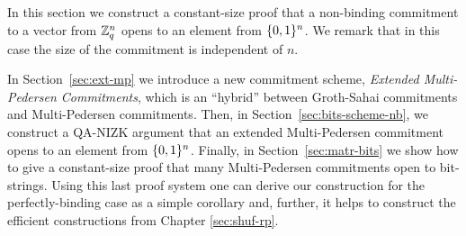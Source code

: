 In this section we construct a constant-size proof that a non-binding commitment to a vector from $\mathbb{Z}_q^n$ opens to an element from $\{0,1\}^n$. We remark that in this case the size of the commitment is independent of $n$. 

In Section~\ref{sec:ext-mp} we introduce a new commitment scheme, \emph{Extended Multi-Pedersen Commitments}, which is an ``hybrid'' between Groth-Sahai commitments and Multi-Pedersen commitments.
Then, in Section~\ref{sec:bits-scheme-nb}, we construct a QA-NIZK argument that an extended Multi-Pedersen commitment opens to an element from $\{0,1\}^n$. Finally, in Section~\ref{sec:matr-bits} we show how to give a constant-size proof that many Multi-Pedersen commitments open to bit-strings. Using this last proof system one can derive our construction for the perfectly-binding case as a simple corollary and, further, it helps to construct the efficient constructions from Chapter \ref{sec:shuf-rp}.
